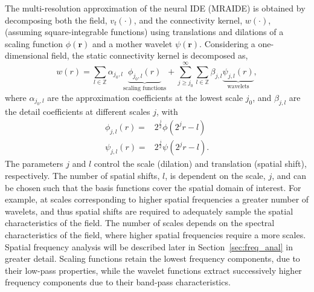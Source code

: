 \documentclass[review,authoryear,3p]{elsarticle}
\begin{document}
The multi-resolution approximation \citep{Mallat1989a} of the neural IDE (MRAIDE) is obtained by decomposing both the field, $v_t(\cdot)$, and the connectivity kernel, $w(\cdot)$, (assuming square-integrable functions) using translations and dilations of a scaling function $\phi(\mathbf{r})$ and a mother wavelet $\psi(\mathbf{r})$. Considering a  one-dimensional field, the static connectivity kernel is decomposed as,
\begin{equation}
 w\left(r\right)=\sum_{l\in \mathbb{Z}}\alpha_{j_0,l} \underbrace{\phi_{j_0,l}\left(r\right)}_{\text{scaling functions}} + \sum_{j\geq j_0}^{\infty} \sum_{l \in \mathbb{Z}}\beta_{j,l} \underbrace{\psi_{j,l}\left(r\right)}_{\text{wavelets}}, 
\label{eq:KernelExpansion}
\end{equation}
where $\alpha_{j_0,l}$ are the approximation coefficients at the lowest scale $j_0$, and $\beta_{j,l}$ are the detail coefficients at different scales $j$, with
\begin{align}
\phi_{j,l}\left(r\right) =& 2^{\frac{j}{2}}\phi\left(2^j r-l\right) \label{eq:generalscalingfinction}\\	
\psi_{j,l}\left(r\right) =& 2^{\frac{j}{2}}\psi\left(2^j r-l\right).  \label{eq:generalwaveletfinction}
\end{align}
The parameters $j$ and $l$ control the scale (dilation) and translation (spatial shift), respectively. The number of spatial shifts, $l$, is dependent on the scale, $j$, and can be chosen such that the basis functions cover the spatial domain of interest. For example, at scales corresponding to higher spatial frequencies a greater number of wavelets, and thus spatial shifts are required to adequately sample the spatial characteristics of the field. The number of scales depends on the spectral characteristics of the field, where higher spatial frequencies require a more scales. Spatial frequency analysis will be described later in Section~\ref{sec:freq_anal} in greater detail. Scaling functions retain the lowest frequency components, due to their low-pass properties, while the wavelet functions extract successively higher frequency components due to their band-pass characteristics. 
\end{document}

